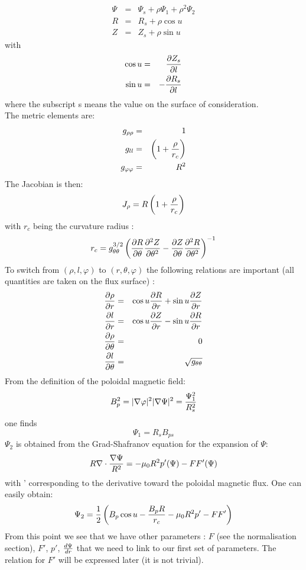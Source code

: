 \begin{eqnarray}
\Psi &=& \Psi_s + \rho \Psi_1 + \rho^2 \Psi_2 \\
R &=& R_s + \rho \cos{u} \\
Z &=& Z_s + \rho \sin{u}
\end{eqnarray}
with 
\begin{eqnarray}
\cos u &=& \frac{\partial  Z_s}{\partial l} \\
\sin u &=& - \frac{\partial  R_s}{\partial l}
\end{eqnarray}
where the subscript s means the value on the surface of consideration. \\
The metric elements are: 
\begin{eqnarray}
g_{\rho \rho} &=& 1 \\
g_{ll} &=& \left(1 + {\rho \over r_c} \right) \\
g_{\varphi \varphi} &=& R^2
\end{eqnarray}
The Jacobian is then:
\begin{equation}
J_\rho = R \left(1 + {\rho \over r_c}\right) 
\end{equation}
with $r_c$ being the curvature radius :
\begin{equation}
r_c = g_{\theta \theta}^{3/2} \left(\frac{\partial  R}{\partial \theta}\frac{\partial^2 Z}{\partial  \theta^2}-\frac{\partial  Z}{\partial \theta}\frac{\partial^2 R}{\partial \theta^2}\right)^{-1} 
\end{equation}
To switch from $(\rho,l,\varphi)$ to $(r,\theta,\varphi)$ the following relations are important (all quantities are taken on the flux surface)  :
\begin{eqnarray}
\frac{\partial  \rho}{\partial r} &=& \cos u \frac{\partial  R}{\partial r} + \sin u \frac{\partial  Z}{\partial r} \\
\frac{\partial  l}{\partial r} &=& \cos u \frac{\partial  Z}{\partial r} - \sin u \frac{\partial  R}{\partial r} \\
\frac{\partial  \rho}{\partial \theta} &=& 0 \\
\frac{\partial  l}{\partial \theta} &=& \sqrt{g_{\theta \theta}}
\end{eqnarray}
From the definition of the poloidal magnetic field:
\begin{equation}
B_p^2 = |\nabla \varphi|^2|\nabla \Psi|^2 = {\Psi_1 ^2 \over R_s ^2 }
\end{equation}
one finds
\begin{equation}
\Psi_1 = R_s B_{ps}
\end{equation}
$\Psi_2$ is obtained from the Grad-Shafranov equation for the expansion of $\Psi$:
\begin{equation}
R \nabla \cdot{\nabla \Psi \over R^2} = -\mu_0 R^2 p'(\Psi) - FF'(\Psi)
\end{equation}
with ' corresponding to the derivative toward the poloidal magnetic flux.
One can easily obtain: 
\begin{equation}
\Psi_2 = {1 \over 2}\left(B_p \cos u - {B_p R \over r_c} - \mu_0 R^2 p' - FF'\right)
\end{equation}
From this point we see that we have other parameters : $F$ (see the normalisation section), $F'$, $p'$, ${d \Psi \over dr}$ that we need to link to our first set of parameters.
The relation for $F'$ will be expressed later (it is not trivial).
